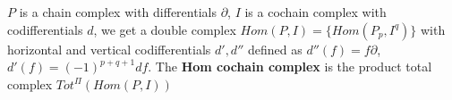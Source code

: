 \documentclass[../main.tex]{subfiles}
\begin{document}
\begin{definition}
$P$ is a chain complex with differentials $\partial$, $I$ is a cochain complex with codifferentials $d$, we get a double complex $Hom(P,I)=\{Hom(P_p,I^q)\}$ with horizontal and vertical codifferentials $d',d''$ defined as $d''(f)=f\partial$, $d'(f)=(-1)^{p+q+1}df$. The \textbf{Hom cochain complex} is the product total complex $Tot^\Pi(Hom(P,I))$
\end{definition}
\end{document}
